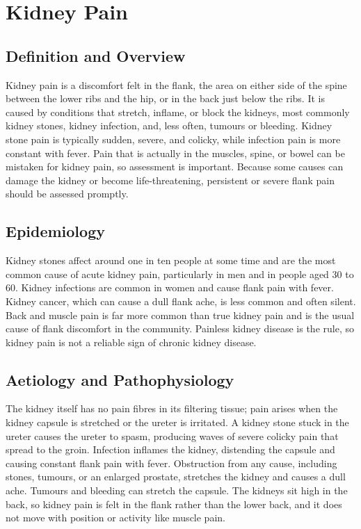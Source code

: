\chapter{Kidney Pain}

\section*{Definition and Overview}
Kidney pain is a discomfort felt in the flank, the area on either side of the spine between the lower ribs and the hip, or in the back just below the ribs. It is caused by conditions that stretch, inflame, or block the kidneys, most commonly kidney stones, kidney infection, and, less often, tumours or bleeding. Kidney stone pain is typically sudden, severe, and colicky, while infection pain is more constant with fever. Pain that is actually in the muscles, spine, or bowel can be mistaken for kidney pain, so assessment is important. Because some causes can damage the kidney or become life-threatening, persistent or severe flank pain should be assessed promptly.

\section*{Epidemiology}
Kidney stones affect around one in ten people at some time and are the most common cause of acute kidney pain, particularly in men and in people aged 30 to 60. Kidney infections are common in women and cause flank pain with fever. Kidney cancer, which can cause a dull flank ache, is less common and often silent. Back and muscle pain is far more common than true kidney pain and is the usual cause of flank discomfort in the community. Painless kidney disease is the rule, so kidney pain is not a reliable sign of chronic kidney disease.

\section*{Aetiology and Pathophysiology}
The kidney itself has no pain fibres in its filtering tissue; pain arises when the kidney capsule is stretched or the ureter is irritated. A kidney stone stuck in the ureter causes the ureter to spasm, producing waves of severe colicky pain that spread to the groin. Infection inflames the kidney, distending the capsule and causing constant flank pain with fever. Obstruction from any cause, including stones, tumours, or an enlarged prostate, stretches the kidney and causes a dull ache. Tumours and bleeding can stretch the capsule. The kidneys sit high in the back, so kidney pain is felt in the flank rather than the lower back, and it does not move with position or activity like muscle pain.

